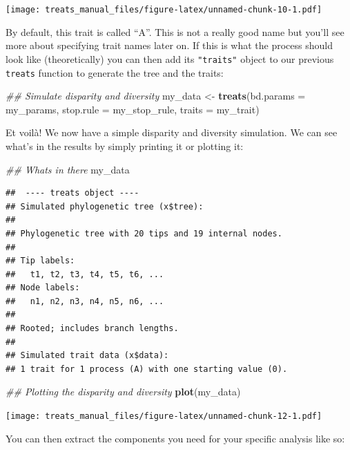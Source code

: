 \documentclass[
]{book}
\newenvironment{Shaded}{\begin{snugshade}}{\end{snugshade}}
\newcommand{\CommentTok}[1]{\textcolor[rgb]{0.56,0.35,0.01}{\textit{#1}}}
\newcommand{\DataTypeTok}[1]{\textcolor[rgb]{0.13,0.29,0.53}{#1}}
\newcommand{\KeywordTok}[1]{\textcolor[rgb]{0.13,0.29,0.53}{\textbf{#1}}}
\newcommand{\NormalTok}[1]{#1}
\newcommand{\StringTok}[1]{\textcolor[rgb]{0.31,0.60,0.02}{#1}}
\begin{document}
\texttt{[image: treats\_manual\_files/figure-latex/unnamed-chunk-10-1.pdf]}

By default, this trait is called ``A''.
This is not a really good name but you'll see more about specifying trait names later on.
If this is what the process should look like (theoretically) you can then add its \texttt{"traits"} object to our previous \texttt{treats} function to generate the tree and the traits:

\begin{Shaded}
\begin{Highlighting}[]
\CommentTok{\#\# Simulate disparity and diversity}
\NormalTok{my\_data \textless{}{-}}\StringTok{ }\KeywordTok{treats}\NormalTok{(}\DataTypeTok{bd.params =}\NormalTok{ my\_params,}
                \DataTypeTok{stop.rule =}\NormalTok{ my\_stop\_rule,}
                \DataTypeTok{traits    =}\NormalTok{ my\_trait)}
\end{Highlighting}
\end{Shaded}

Et voilà! We now have a simple disparity and diversity simulation.
We can see what's in the results by simply printing it or plotting it:

\begin{Shaded}
\begin{Highlighting}[]
\CommentTok{\#\# What\textquotesingle{}s in there}
\NormalTok{my\_data}
\end{Highlighting}
\end{Shaded}

\begin{verbatim}
##  ---- treats object ---- 
## Simulated phylogenetic tree (x$tree):
## 
## Phylogenetic tree with 20 tips and 19 internal nodes.
## 
## Tip labels:
##   t1, t2, t3, t4, t5, t6, ...
## Node labels:
##   n1, n2, n3, n4, n5, n6, ...
## 
## Rooted; includes branch lengths.
## 
## Simulated trait data (x$data):
## 1 trait for 1 process (A) with one starting value (0).
\end{verbatim}

\begin{Shaded}
\begin{Highlighting}[]
\CommentTok{\#\# Plotting the disparity and diversity}
\KeywordTok{plot}\NormalTok{(my\_data)}
\end{Highlighting}
\end{Shaded}

\texttt{[image: treats\_manual\_files/figure-latex/unnamed-chunk-12-1.pdf]}

You can then extract the components you need for your specific analysis like so:
\end{document}
